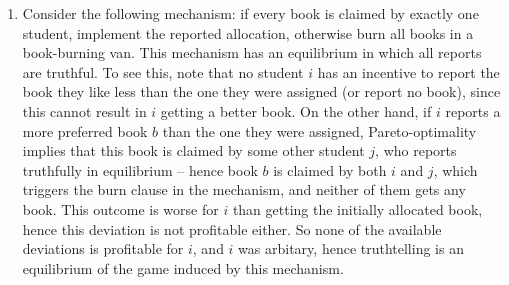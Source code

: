 \documentclass[a4paper]{article}
\begin{document}
\begin{enumerate}
	\item Consider the following mechanism: if every book is claimed by exactly one student, implement the reported allocation, otherwise burn all books in a book-burning van. This mechanism has an equilibrium in which all reports are truthful. To see this, note that no student $i$ has an incentive to report the book they like less than the one they were assigned (or report no book), since this cannot result in $i$ getting a better book. On the other hand, if $i$ reports a more preferred book $b$ than the one they were assigned, Pareto-optimality implies that this book is claimed by some other student $j$, who reports truthfully in equilibrium -- hence book $b$ is claimed by both $i$ and $j$, which triggers the burn clause in the mechanism, and neither of them gets any book. This outcome is worse for $i$ than getting the initially allocated book, hence this deviation is not profitable either. So none of the available deviations is profitable for $i$, and $i$ was arbitary, hence truthtelling is an equilibrium of the game induced by this mechanism.
\end{enumerate}
\fi
\end{document}
